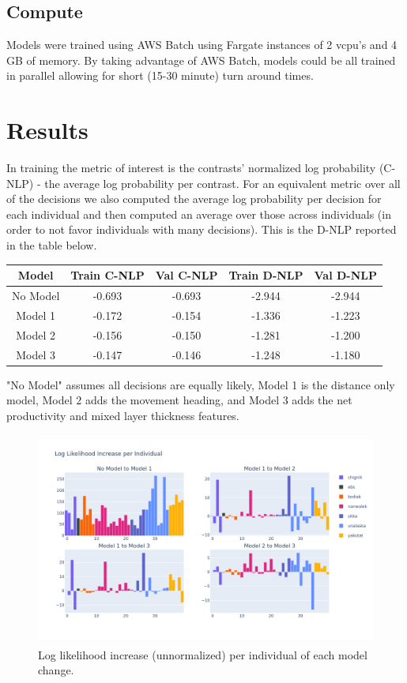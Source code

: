\documentclass[11pt]{article}
\begin{document}
\subsection*{Compute}

Models were trained using AWS Batch using Fargate instances of 2 vcpu's and 4 GB of memory. By taking advantage of AWS Batch,  models could be all trained in parallel allowing for short (15-30 minute) turn around times. 

\section*{Results}

In training the metric of interest is the contrasts' normalized log probability (C-NLP) - the average log probability per contrast. For an equivalent metric over all of the decisions we also computed the average log probability per decision for each individual and then computed an average over those across individuals (in order to not favor individuals with many decisions). This is the D-NLP reported in the table below. 

\begin{center}
\begin{tabular}{| c | c | c | c | c |}
\hline 
Model & Train C-NLP & Val C-NLP & Train D-NLP & Val D-NLP \\
\hline
No Model & -0.693 & -0.693 & -2.944 & -2.944 \\
Model 1 & -0.172 & -0.154 & -1.336 & -1.223 \\
Model 2 & -0.156 & -0.150 & -1.281 & -1.200 \\
Model 3 & -0.147 & -0.146 & -1.248 & -1.180 \\
\hline
\end{tabular}
\end{center}

"No Model" assumes all decisions are equally likely, Model 1 is the distance only model, Model 2 adds the movement heading, and Model 3 adds the net productivity and mixed layer thickness features. \newline

\begin{figure}[h!] 
	\centering
  \includegraphics[height=70mm]{figures/ll_increase.png}
  \caption{Log likelihood increase (unnormalized) per individual of each model change.}
  \label{fig:ll_increase}
\end{figure}
\end{document}
